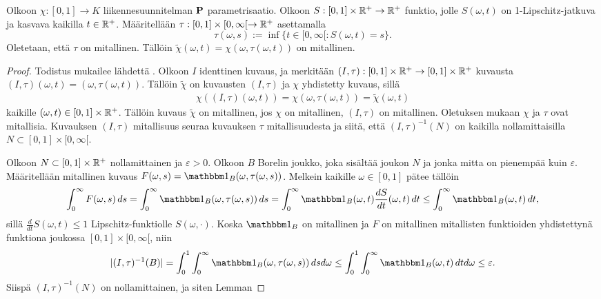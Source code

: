 \documentclass[12pt,oneside,a4paper]{amsbook} %
\begin{document}
\begin{lemma}\label{le:parametrizeLemma}
    Olkoon $\chi : [0, 1] \to K$ liikennesuunnitelman $\P$ parametrisaatio. Olkoon $S:[0,1]\times \Rp \to \Rp$ funktio, jolle $S(\omega, t)$ on 1-Lipschitz-jatkuva ja kasvava kaikilla $t \in \Rp$. Määritellään $\tau:[0, 1] \times [0, \infty [ \to \Rp$ asettamalla
    \begin{equation*}
        \tau(\omega, s) := \inf \{t \in [0, \infty[ : S(\omega, t) = s\}.
    \end{equation*}
    Oletetaan, että $\tau$ on mitallinen. Tällöin $\tilde\chi(\omega, t) = \chi(\omega, \tau(\omega, t))$ on mitallinen.
\end{lemma}
\begin{proof}
    Todistus mukailee lähdettä \cite[s.44]{optimal}. Olkoon $I$ identtinen kuvaus, ja merkitään $(I, \tau) : [0, 1] \times \Rp \to [0, 1] \times \Rp $  kuvausta $(I, \tau)(\omega, t) = (\omega, \tau(\omega, t))$. Tällöin $\tilde \chi$ on kuvausten $(I, \tau)$ ja $\chi$ yhdistetty kuvaus, sillä
    \begin{align*}
        \chi((I, \tau)(\omega, t)) = \chi(\omega, \tau(\omega, t)) = \tilde \chi(\omega, t)
    \end{align*}
    kaikille $(\omega, t) \in [0, 1] \times \Rp$. Tällöin kuvaus $\tilde \chi$ on mitallinen, jos $\chi$ on mitallinen, $(I, \tau)$ on mitallinen. Oletuksen mukaan $\chi$ ja $\tau$ ovat mitallisia. Kuvauksen $(I, \tau)$ mitallisuus seuraa kuvauksen $\tau$ mitallisuudesta ja siitä, että $(I, \tau)^{-1}(N)$ on  kaikilla nollamittaisilla $N \subset [0, 1] \times [0, \infty[$. 
    
    Olkoon $N \subset [0, 1] \times \Rp$ nollamittainen ja $\varepsilon > 0$. Olkoon $B$ Borelin joukko, joka sisältää joukon $N$ ja jonka mitta on pienempää kuin $\varepsilon$. Määritellään mitallinen kuvaus $F(\omega, s) = \indfct{B}(\omega, \tau(\omega, s))$. Melkein kaikille $\omega \in [0,1]$ pätee tällöin
    \begin{align}
        \int_0^\infty F(\omega, s) \, ds = \int_0^\infty \indfct{B}(\omega, \tau(\omega, s))\, ds = \int_0^\infty \indfct{B}(\omega, t)\frac{d S}{d t}(\omega, t) \, dt \le \int_0^\infty \indfct{B}(\omega, t)\, dt,
    \end{align}
    sillä $\frac{d}{dt}S(\omega, t)\le 1$ Lipschitz-funktiolle $S(\omega, \cdot)$. Koska $\indfct{B}$ on mitallinen ja $F$ on mitallinen mitallisten funktioiden yhdistettynä funktiona joukossa $[0, 1] \times [0, \infty[$, niin
    \begin{align*}
        |(I, \tau)^{-1}(B)| = \int_0^1\int_0^\infty \indfct{B}(\omega, \tau(\omega, s)) \, dsd\omega \le \int_0^1\int_0^\infty \indfct{B}(\omega, t) \, dtd\omega \le \varepsilon.
    \end{align*}
Siispä $(I, \tau)^{-1}(N)$ on nollamittainen, ja siten Lemman 
\end{proof}
\end{document}
